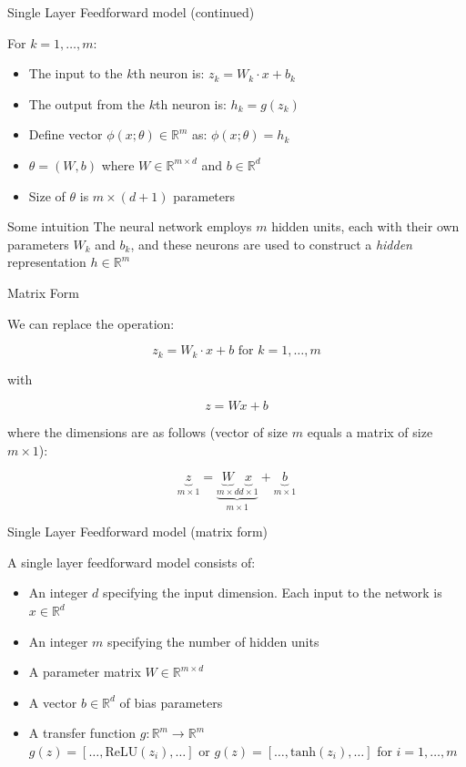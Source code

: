 \begin{frame}{Single Layer Feedforward model (continued)}
\begin{block}{For $k = 1, \ldots, m$:}
\begin{itemize}[<+->]
\item The input to the $k$th neuron is: 
\( z_k = W_k \cdot x + b_k \)
\item The output from the $k$th neuron is: 
\( h_k = g(z_k) \)
\item Define vector $\phi(x; \theta) \in \mathbb{R}^m$ as:
\( \phi(x; \theta) = h_k \)
\item $\theta = (W, b)$ where $W \in \mathbb{R}^{m \times d}$ and $b \in \mathbb{R}^d$
\item Size of $\theta$ is $m \times (d+1)$ parameters 
\end{itemize}
\end{block}
\pause
\begin{block}{Some intuition}
The neural network employs $m$ hidden units, each with their own parameters $W_k$ and $b_k$, and these neurons are used to construct a \textit{hidden} representation $h \in \mathbb{R}^m$
\end{block}
\end{frame}

\begin{frame}{Matrix Form}
\begin{block}{}
We can replace the operation:

\[ z_k = W_k \cdot x + b \textrm{ for } k = 1, \ldots, m \]

with

\[ z = Wx + b \]

where the dimensions are as follows (vector of size $m$ equals a matrix of size $m \times 1$):

\[ \underbrace{z}_{m \times 1} = \underbrace{\underbrace{W}_{m \times d} \underbrace{x}_{d \times 1}}_{m \times 1} + \underbrace{b}_{m \times 1} \]

\end{block}
\end{frame}

\begin{frame}{Single Layer Feedforward model (matrix form)}
\begin{block}{A single layer feedforward model consists of:}
\begin{itemize}[<+->]
\item An integer $d$ specifying the input dimension. Each input to the network is $x \in \mathbb{R}^d$
\item An integer $m$ specifying the number of hidden units
\item A parameter matrix $W \in \mathbb{R}^{m \times d}$
\item A vector $b \in \mathbb{R}^d$ of bias parameters
\item A transfer function $g : \mathbb{R}^m \rightarrow \mathbb{R}^m$\\
$g(z) = [ \ldots, \textrm{ReLU}(z_i), \ldots ]$ or $g(z) = [ \ldots, \textrm{tanh}(z_i), \ldots ]$ for $i = 1, \ldots, m$
\end{itemize}
\end{block}
\end{frame}

